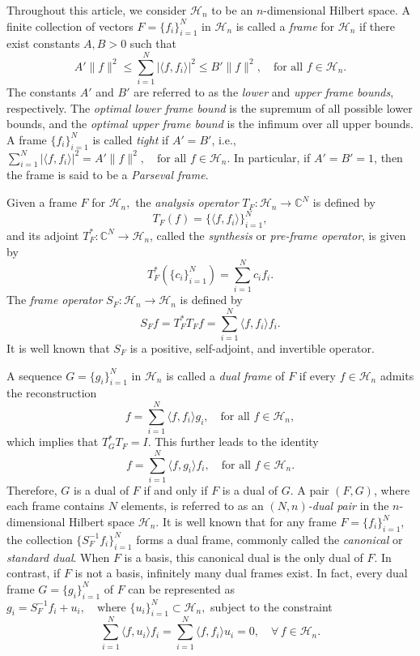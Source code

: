 \documentclass[final,1p,times]{elsarticle}
\begin{document}
Throughout this article, we consider $\mathcal{H}_n$ to be an $n$-dimensional Hilbert space. A finite collection of vectors $F = \{f_i\}_{i=1}^N$ in $\mathcal{H}_n$ is called a \textit{frame} for $\mathcal{H}_n$ if there exist constants $A, B > 0$ such that
\[
A' \|f\|^2 \leq \sum_{i=1}^N |\langle f, f_i \rangle|^2 \leq B' \|f\|^2, \quad \text{for all } f \in \mathcal{H}_n.
\]
The constants $A'$ and $B'$ are referred to as the \textit{lower} and \textit{upper frame bounds}, respectively. The \textit{optimal lower frame bound} is the supremum of all possible lower bounds, and the \textit{optimal upper frame bound} is the infimum over all upper bounds. A frame $\{f_i\}_{i=1}^N$ is called \textit{tight} if $A' = B'$, i.e., $\sum_{i=1}^N |\langle f, f_i \rangle|^2 = A' \|f\|^2, \quad \text{for all } f \in \mathcal{H}_n.$ In particular, if $A' = B' = 1$, then the frame is said to be a \textit{Parseval frame}.

 Given a frame $F$ for $\mathcal{H}_n,$ the \textit{analysis operator} $T_F : \mathcal{H}_n \to \mathbb{C}^N$ is defined by
\[
T_F(f) = \{\langle f, f_i \rangle\}_{i=1}^N,
\]
and its adjoint $T_F^* : \mathbb{C}^N \to \mathcal{H}_n$, called the \textit{synthesis} or \textit{pre-frame operator}, is given by
\[
T_F^*(\{c_i\}_{i=1}^N) = \sum_{i=1}^N c_i f_i.
\]
The \textit{frame operator} $S_F : \mathcal{H}_n \to \mathcal{H}_n$ is defined by
\[
S_F f = T_F^* T_F f = \sum_{i=1}^N \langle f, f_i \rangle f_i.
\]
It is well known that $S_F$ is a positive, self-adjoint, and invertible operator.

A sequence $G = \{g_i\}_{i=1}^N$ in $\mathcal{H}_n$ is called a \textit{dual frame} of $F$ if every $f \in \mathcal{H}_n$ admits the reconstruction
\begin{equation}\label{eqn2point1reconstruction}
    f = \sum_{i=1}^N \langle f, f_i \rangle g_i, \quad \text{for all } f \in \mathcal{H}_n,
\end{equation}
which implies that $T_G^* T_F = I$. This further leads to the identity
\[
f = \sum_{i=1}^N \langle f, g_i \rangle f_i, \quad \text{for all } f \in \mathcal{H}_n.
\]
Therefore, \( G \) is a dual of \( F \) if and only if \( F \) is a dual of \( G \). A pair \( (F, G) \), where each frame contains \( N \) elements, is referred to as an \textit{\((N, n)\)-dual pair} in the \( n \)-dimensional Hilbert space \( \mathcal{H}_n \). It is well known that for any frame \( F = \{f_i\}_{i=1}^N \), the collection \( \{S_F^{-1} f_i\}_{i=1}^N \) forms a dual frame, commonly called the \textit{canonical} or \textit{standard dual}. When \( F \) is a basis, this canonical dual is the only dual of $F$. In contrast, if \( F \) is not a basis, infinitely many dual frames exist. In fact, every dual frame \( G = \{g_i\}_{i=1}^N \) of \( F \) can be represented as  $g_i = S_F^{-1} f_i + u_i, \quad \text{where } \{u_i\}_{i=1}^N \subset \mathcal{H}_n,$ subject to the constraint  
\[
\sum_{i=1}^N \langle f, u_i \rangle f_i = \sum_{i=1}^N \langle f, f_i \rangle u_i = 0, \quad \forall\, f \in \mathcal{H}_n.
\]
\end{document}
